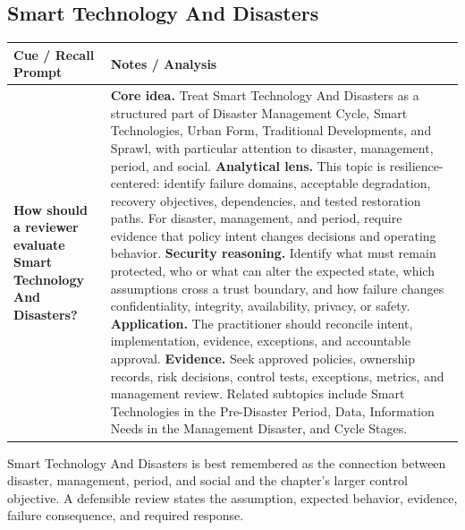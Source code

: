 \documentclass[11pt]{article}
\newcommand{\CornellHeader}{%
\rowcolor{Navy}\color{white}\bfseries Cue / Recall Prompt & \color{white}\bfseries Notes / Analysis\\\hline}
\newcommand{\CornellRow}[2]{%
\cellcolor{CueGray}\RaggedRight\textbf{#1} & \RaggedRight #2\\\hline}
\begin{document}
\subsection*{Smart Technology And Disasters}
\begin{longtable}{>{\RaggedRight\arraybackslash}p{}|>{\RaggedRight\arraybackslash}p{}}
\CornellHeader
\CornellRow{How should a reviewer evaluate Smart Technology And Disasters?}{\textbf{Core idea.} Treat Smart Technology And Disasters as a structured part of Disaster Management Cycle, Smart Technologies, Urban Form, Traditional Developments, and Sprawl, with particular attention to disaster, management, period, and social. \textbf{Analytical lens.} This topic is resilience-centered: identify failure domains, acceptable degradation, recovery objectives, dependencies, and tested restoration paths. For disaster, management, and period, require evidence that policy intent changes decisions and operating behavior. \textbf{Security reasoning.} Identify what must remain protected, who or what can alter the expected state, which assumptions cross a trust boundary, and how failure changes confidentiality, integrity, availability, privacy, or safety. \textbf{Application.} The practitioner should reconcile intent, implementation, evidence, exceptions, and accountable approval. \textbf{Evidence.} Seek approved policies, ownership records, risk decisions, control tests, exceptions, metrics, and management review. Related subtopics include Smart Technologies in the Pre-Disaster Period, Data, Information Needs in the Management Disaster, and Cycle Stages.}
\end{longtable}
\begin{topicsummary}
Smart Technology And Disasters is best remembered as the connection between disaster, management, period, and social and the chapter's larger control objective. A defensible review states the assumption, expected behavior, evidence, failure consequence, and required response.
\end{topicsummary}
\end{document}
